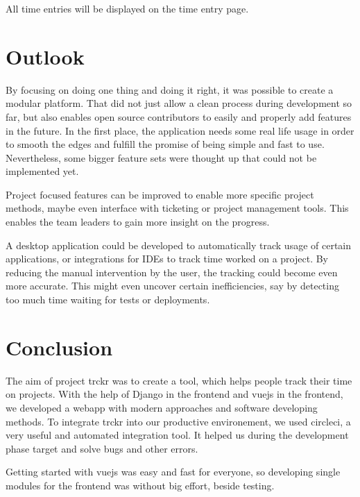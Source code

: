 \documentclass[bibliography=totoc, listof=totocnumbered]{scrartcl}
\begin{document}
All time entries will be displayed on the time entry page.

\section{Outlook}
By focusing on doing one thing and doing it right, it was possible to create a
modular platform. That did not just allow a clean process during development so
far, but also enables open source contributors to easily and properly add
features in the future. In the first place, the application needs some real life
usage in order to smooth the edges and fulfill the promise of being simple and
fast to use. Nevertheless, some bigger feature sets were thought up that could
not be implemented yet.

Project focused features can be improved to enable more specific project
methods, maybe even interface with ticketing or project management tools. This
enables the team leaders to gain more insight on the progress.

A desktop application could be developed to automatically track usage of certain
applications, or integrations for IDEs to track time worked on a project. By
reducing the manual intervention by the user, the tracking could become even
more accurate. This might even uncover certain inefficiencies, say by detecting
too much time waiting for tests or deployments.

\section{Conclusion}
The aim of project trckr was to create a tool, which helps people track their
time on projects. With the help of Django in the frontend and vuejs in the
frontend, we developed a webapp with modern approaches and software developing
methods. To integrate trckr into our productive environement, we used circleci,
a very useful and automated integration tool. It helped us during the development
phase target and solve bugs and other errors.

Getting started with vuejs was easy and fast for everyone, so developing single
modules for the frontend was without big effort, beside testing.

\clearpage
\begin{appendices}
\printbibliography
\listoffigures
\end{appendices}
\end{document}
